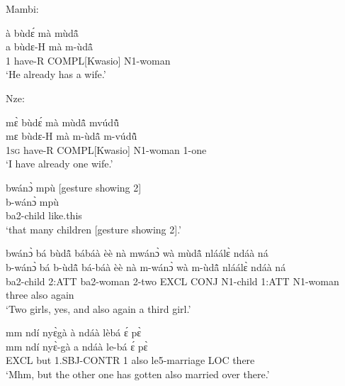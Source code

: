 \noindent Mambi:

\begin{exe} 
\exC\label{142}  
  \glll à bùdɛ́ mà mùdã̂ \\
        a bùdɛ-H mà m-ùdã̂ \\
          1 have-R COMPL[Kwasio] N1-woman  \\
    \trans `He already has a wife.'
\end{exe}

\noindent Nze:

\begin{exe} 
\exC\label{143} 
  \glll  mɛ̀ bùdɛ́ mà mùdã̂ mvúdũ̂ \\
         mɛ bùdɛ-H mà m-ùdã̂ m-vúdũ̂ \\
         1\textsc{sg} have-R COMPL[Kwasio]  N1-woman 1-one  \\
    \trans `I have already one wife.'
\end{exe}

\begin{exe} 
\exC\label{144} 
  \glll  bwánɔ̀ mpù [gesture showing 2] \\
          b-wánɔ̀ mpù \\
         ba2-child like.this   \\
    \trans `that many children [gesture showing 2].'
\end{exe}

\begin{exe} 
\exC\label{145} 
  \glll  bwánɔ̀ bá bùdã̂ bábáà èè nà mwánɔ̀ wà mùdã̂ nláálɛ̀ ndáà ná \\
         b-wánɔ̀ bá b-ùdã̂ bá-báà èè nà m-wánɔ̀ wà m-ùdã̂ nláálɛ̀ ndáà ná \\
         ba2-child 2:ATT ba2-woman 2-two EXCL CONJ N1-child 1:ATT N1-woman three also again   \\
    \trans `Two girls, yes, and also again a third girl.'
\end{exe}

\begin{exe} 
\exC\label{146} 
  \glll  mm ndí nyɛ̀gà à ndáà lèbá ɛ́ pɛ̀ \\
        mm ndí nyɛ̀-gà a ndáà le-bá ɛ́ pɛ̀ \\
          EXCL but 1.SBJ-CONTR 1 also le5-marriage LOC there  \\
    \trans `Mhm, but the other one has gotten also married over there.'
\end{exe}

